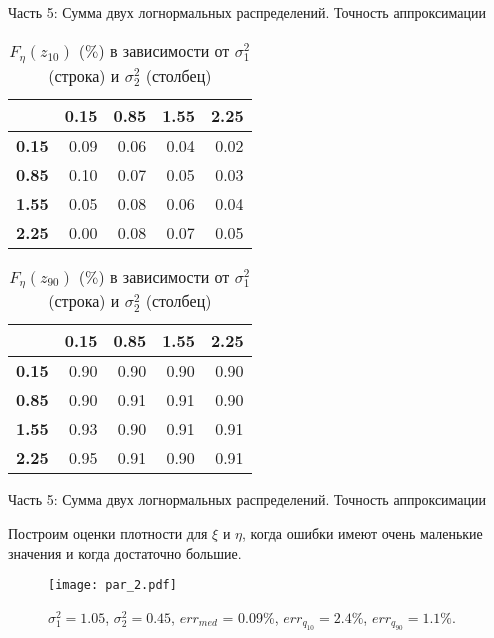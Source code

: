 \documentclass[ucs, notheorems, handout]{beamer}
\begin{document}
\begin{frame}{Часть 5: Сумма двух логнормальных распределений. Точность аппроксимации}
	
	\begin{table}[!hhh]
		\centering
		\caption{$F_{\eta}(z_{10})$ ($\%$) в зависимости от $\sigma_{1}^{2}$ (строка) и $\sigma_{2}^{2}$ (столбец) }
		\label{tab5}
		\begin{tabular}{rrrrr}
			\hline
			& \textbf{0.15} & \textbf{0.85} & \textbf{1.55} & \textbf{2.25} \\
			\hline
			\textbf{0.15} & 0.09 & 0.06 & 0.04 & 0.02 \\ 
			\textbf{0.85} & 0.10 & 0.07 & 0.05 & 0.03 \\ 
			\textbf{1.55} & 0.05 & 0.08 & 0.06 & 0.04 \\ 
			\textbf{2.25} & 0.00 & 0.08 & 0.07 & 0.05 \\ 
			\hline
		\end{tabular}
	\end{table}
	
	\begin{table}[!hhh]
		\centering
		\caption{$F_{\eta}(z_{90})$ ($\%$) в зависимости от $\sigma_{1}^{2}$ (строка) и $\sigma_{2}^{2}$ (столбец)}
		\label{tab6}
		\begin{tabular}{rrrrr}
			\hline
			& \textbf{0.15} & \textbf{0.85} & \textbf{1.55} & \textbf{2.25} \\
			\hline
			\textbf{0.15} & 0.90 & 0.90 & 0.90 & 0.90 \\ 
			\textbf{0.85} & 0.90 & 0.91 & 0.91 & 0.90 \\ 
			\textbf{1.55} & 0.93 & 0.90 & 0.91 & 0.91 \\ 
			\textbf{2.25} & 0.95 & 0.91 & 0.90 & 0.91 \\ 
			\hline
		\end{tabular}
	\end{table}
\end{frame}

\begin{frame}{Часть 5: Сумма двух логнормальных распределений. Точность аппроксимации}
	
	Построим оценки плотности для $\xi$ и $\eta$, когда ошибки имеют очень маленькие значения и когда достаточно большие.
	
	\begin{figure}[h]
		\begin{center}
			\begin{minipage}[h]{0.4\linewidth}
				\texttt{[image: par\_2.pdf]}
				\caption{$\sigma_{1}^{2} = 1.05$, $\sigma_{2}^{2} = 0.45$, $err_{med}$ = 0.09\%,  $err_{q_{10}} = 2.4\%$,  $err_{q_{90}} = 1.1\%$. } %
				\label{ris7} %
			\end{minipage}
			
		\end{center}
	\end{figure}
	
\end{frame}
\end{document}
